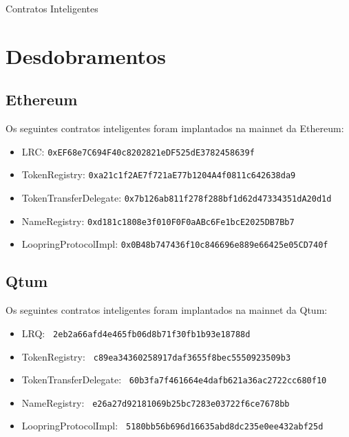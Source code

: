 \documentclass[UTF8,nofonts]{article}
\makeatletter
\newenvironment{figurehere}
 {\def\@captype{figure}}
 {}
\makeatother
\begin{document}
\begin{appendices}
\begin{center}
\begin{figurehere}
\caption{Contratos Inteligentes}
\label{fig:smartcontracts}
\end{figurehere}
\end{center}

\section{Desdobramentos}


\subsection{Ethereum}
Os seguintes contratos inteligentes foram implantados na mainnet da Ethereum:
\begin{itemize}
\item LRC: \verb|0xEF68e7C694F40c8202821eDF525dE3782458639f|
\item TokenRegistry: \verb|0xa21c1f2AE7f721aE77b1204A4f0811c642638da9|
\item TokenTransferDelegate: \verb|0x7b126ab811f278f288bf1d62d47334351dA20d1d|
\item NameRegistry: \verb|0xd181c1808e3f010F0F0aABc6Fe1bcE2025DB7Bb7|
\item LoopringProtocolImpl: \verb|0x0B48b747436f10c846696e889e66425e05CD740f|
\end{itemize}

\subsection{Qtum}
Os seguintes contratos inteligentes foram implantados na mainnet da Qtum:
\begin{itemize}
\item LRQ: \verb| 2eb2a66afd4e465fb06d8b71f30fb1b93e18788d |
\item TokenRegistry: \verb| c89ea34360258917daf3655f8bec5550923509b3 |
\item TokenTransferDelegate: \verb| 60b3fa7f461664e4dafb621a36ac2722cc680f10 |
\item NameRegistry: \verb| e26a27d92181069b25bc7283e03722f6ce7678bb |
\item LoopringProtocolImpl: \verb| 5180bb56b696d16635abd8dc235e0ee432abf25d |
\end{itemize}

\end{appendices}
\end{document}
